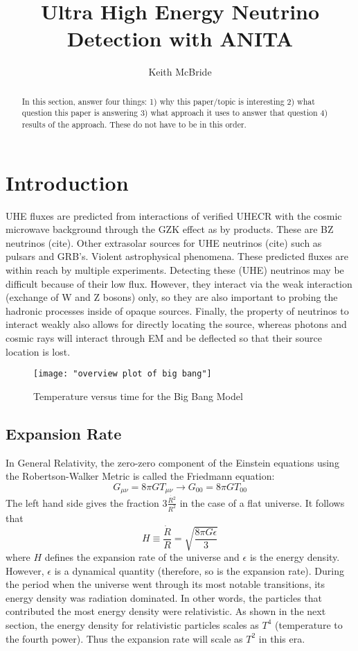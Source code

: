\documentclass[12pt]{article}
\theoremstyle{plain}
\theoremstyle{definition}
\begin{document}
 

\title{Ultra High Energy Neutrino Detection with ANITA}
\author{Keith McBride}
\maketitle
\begin{abstract}
	In this section, answer four things: 1) why this paper/topic is interesting 2) what question this paper is answering 3) what approach it uses to answer that question 4) results of the approach. These do not have to be in this order.
\end{abstract}
\tableofcontents
\section{Introduction}
\hspace{0.2in} UHE fluxes are predicted from interactions of verified UHECR with the cosmic microwave background through the GZK effect as by products. These are BZ neutrinos (cite). Other extrasolar sources for UHE neutrinos (cite) such as pulsars and GRB's. Violent astrophysical phenomena. These predicted fluxes are within reach by multiple experiments. Detecting these (UHE) neutrinos may be difficult because of their low flux. However, they interact via the weak interaction (exchange of W and Z bosons) only, so they are also important to probing the hadronic processes inside of opaque sources. Finally, the property of neutrinos to interact weakly also allows for directly locating the source, whereas photons and cosmic rays will interact through EM and be deflected so that their source location is lost. 
\begin{figure}[h]
	\texttt{[image: "overview plot of big bang"]}
	\centering
	\caption{Temperature versus time for the Big Bang Model \cite{Yagi:2005yb}}
	\centering
\end{figure}
\subsection{Expansion Rate}
\hspace{0.2in} In General Relativity, the zero-zero component of the Einstein equations using the Robertson-Walker Metric is called the Friedmann equation: 
\begin{equation}
G_{\mu\nu}=8 \pi G T_{\mu\nu} \rightarrow G_{00}=8\pi G T_{00}
\end{equation}
The left hand side gives the fraction $3\frac{\dot{R^2}}{R^2}$ in the case of a flat universe. It follows that
\begin{equation}
H\equiv\frac{\dot{R}}{R}=\sqrt{\frac{8\pi G \epsilon}{3}}
\end{equation} 
where $H$ defines the expansion rate of the universe and $\epsilon$ is the energy density. However, $\epsilon$ is a dynamical quantity (therefore, so is the expansion rate). During the period when the universe went through its most notable transitions, its energy density was radiation dominated. In other words, the particles that contributed the most energy density were relativistic. As shown in the next section, the energy density for relativistic particles scales as $T^4$ (temperature to the fourth power). Thus the expansion rate will scale as $T^2$ in this era.
\end{document}
